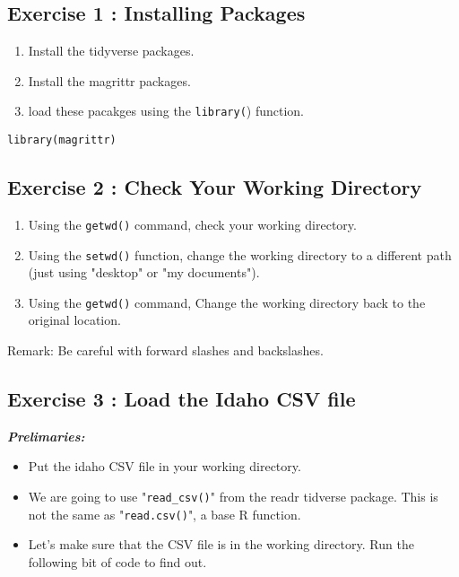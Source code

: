 \documentclass{article}
\begin{document}
	
	
\subsection*{Exercise 1 : Installing Packages}

\begin{enumerate}
\item Install the tidyverse packages.
\item Install the magrittr packages.
\item load these pacakges using the \texttt{library(}) function.
\end{enumerate}


\begin{framed}
\begin{verbatim}
library(magrittr)
\end{verbatim}
\end{framed}

\subsection*{Exercise 2 : Check Your Working Directory}


\begin{enumerate}
\item Using the \texttt{getwd()} command, check your working directory.
\item Using the \texttt{setwd()} function, change the working directory to a different path \\ (just using "desktop" or "my documents").
\item Using the \texttt{getwd()} command, Change the working directory back to the original location.
\end{enumerate}

Remark: Be careful with forward slashes and backslashes.

\smallskip


\subsection*{Exercise 3 : Load the Idaho CSV file}

\textbf{\textit{Prelimaries:}} 
\begin{itemize}
\item Put the idaho CSV file in your working directory.
\item We are going to use "\texttt{read\_csv()}" from the readr tidverse package. This is not the same as "\texttt{read.csv()}", a base R function.
\item Let's make sure that the CSV file is in the working directory. Run the following bit of code to find out.
\end{itemize}
\end{document}
